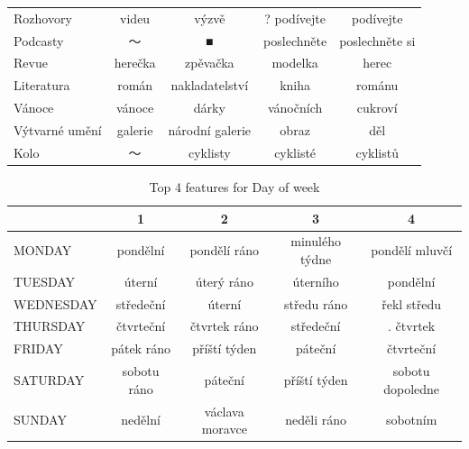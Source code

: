 \begin{table}
\begin{tabular}{lcccc}
Rozhovory      &           videu &            výzvě &    ? podívejte &       podívejte \\
Podcasty       &               〜 &                ■ &    poslechněte &  poslechněte si \\
Revue          &         herečka &         zpěvačka &        modelka &           herec \\
Literatura     &           román &   nakladatelství &          kniha &          románu \\
Vánoce         &          vánoce &            dárky &      vánočních &         cukroví \\
Výtvarné umění &         galerie &  národní galerie &          obraz &             děl \\
Kolo           &               〜 &         cyklisty &       cyklisté &        cyklistů \\
\bottomrule
\end{tabular}
\end{table}

\begin{table}
\centering
\caption{Top 4 features for Day of week}
\label{tab:top4_day_of_week}
\begin{tabular}{lcccc}
\toprule
{} &            1 &                2 &               3 &                 4 \\
\midrule
MONDAY    &     pondělní &     pondělí ráno &  minulého týdne &    pondělí mluvčí \\
TUESDAY   &       úterní &       úterý ráno &        úterního &          pondělní \\
WEDNESDAY &    středeční &           úterní &     středu ráno &       řekl středu \\
THURSDAY  &    čtvrteční &     čtvrtek ráno &       středeční &         . čtvrtek \\
FRIDAY    &   pátek ráno &     příští týden &         páteční &         čtvrteční \\
SATURDAY  &  sobotu ráno &          páteční &    příští týden &  sobotu dopoledne \\
SUNDAY    &      nedělní &  václava moravce &     neděli ráno &          sobotním \\
\bottomrule
\end{tabular}
\end{table}


